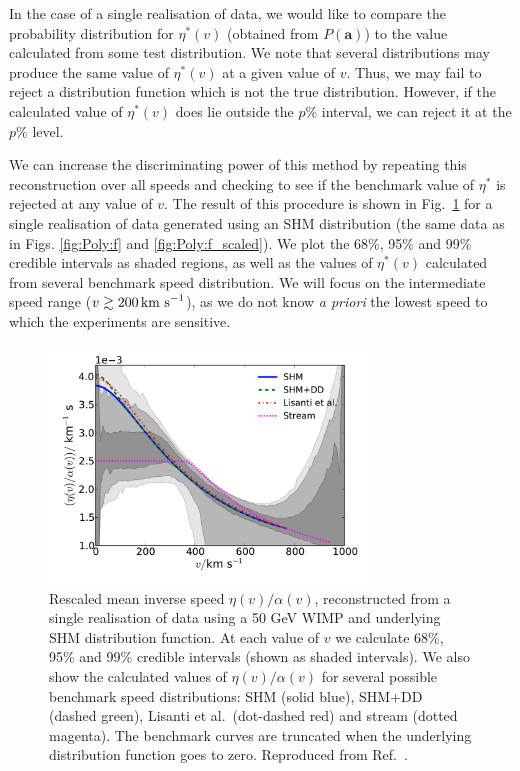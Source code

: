 In the case of a single realisation of data, we would like to compare the probability distribution for $\eta^*(v)$ (obtained from $P(\textbf{a})$) to the value calculated from some test distribution. We note that several distributions may produce the same value of $\eta^*(v)$ at a given value of $v$. Thus, we may fail to reject a distribution function which is not the true distribution. However, if the calculated value of $\eta^*(v)$ does lie outside the $p\%$ interval, we can reject it at the $p\%$ level.

We can increase the discriminating power of this method by repeating this reconstruction over all speeds and checking to see if the benchmark value of $\eta^*$ is rejected at any value of $v$. The result of this procedure is shown in Fig.~\ref{fig:Poly:eta} for a single realisation of data generated using an SHM distribution (the same data as in Figs. \ref{fig:Poly:f} and \ref{fig:Poly:f_scaled}). We plot the 68\%, 95\% and 99\% credible intervals as shaded regions, as well as the values of $\eta^*(v)$ calculated from several benchmark speed distribution. We will focus on the intermediate speed range ($v \gtrsim 200 \,\textrm{km s}^{-1}$), as we do not know \textit{a priori} the lowest speed to which the experiments are sensitive.


\begin{figure}[t]
\centering
  \includegraphics[width=0.75\textwidth]{Poly/SHM_lores.pdf}
  \caption[Rescaled mean inverse speed for a single realisation of data for a 50 GeV WIMP with SHM distribution function, showing several benchmark speed distributions for comparison]{Rescaled mean inverse speed $\eta(v)/\alpha(v)$, reconstructed from a single realisation of data using a 50 GeV WIMP and underlying SHM distribution function. At each value of $v$ we calculate 68\%, 95\% and 99\% credible intervals (shown as shaded intervals). We also show the calculated values of $\eta(v)/\alpha(v)$ for several possible benchmark speed distributions: SHM (solid blue), SHM+DD (dashed green), Lisanti et al.\ (dot-dashed red) and stream (dotted magenta). The benchmark curves are truncated when the underlying distribution function goes to zero. Reproduced from Ref.~\cite{Kavanagh:2014}.}
  \label{fig:Poly:eta}
\end{figure}

